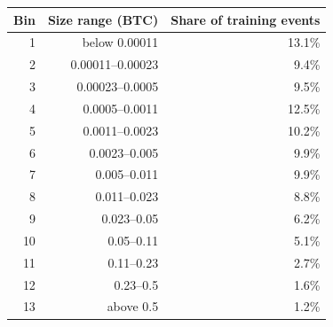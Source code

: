 \begin{tabular}{rrr}
\toprule
Bin & Size range (BTC) & Share of training events \\
\midrule
1 & below 0.00011 & 13.1\% \\
2 & 0.00011--0.00023 & 9.4\% \\
3 & 0.00023--0.0005 & 9.5\% \\
4 & 0.0005--0.0011 & 12.5\% \\
5 & 0.0011--0.0023 & 10.2\% \\
6 & 0.0023--0.005 & 9.9\% \\
7 & 0.005--0.011 & 9.9\% \\
8 & 0.011--0.023 & 8.8\% \\
9 & 0.023--0.05 & 6.2\% \\
10 & 0.05--0.11 & 5.1\% \\
11 & 0.11--0.23 & 2.7\% \\
12 & 0.23--0.5 & 1.6\% \\
13 & above 0.5 & 1.2\% \\
\bottomrule
\end{tabular}
